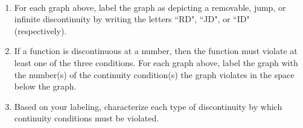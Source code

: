 \documentclass[11pt]{article}
\begin{document}
\begin{enumerate}
\begin{tikzpicture}[scale=1]
        \end{tikzpicture}
        \hfill
    \hfill\,\\


%
\begin{enumerate}
\item[i.] For each graph above, label the graph as depicting a removable, jump, or infinite discontinuity by writing the letters ``RD", ``JD", or ``ID" (respectively).\\
\item[ii.] If a function is discontinuous at a number, then the function must violate at least one of the three conditions. For each graph above, label the graph with the number(s) of the continuity condition(s) the graph violates in the space below the graph.\\
\item[iii.] Based on your labeling, characterize each type of discontinuity by which continuity conditions must be violated.
\end{enumerate}
    

\newpage



\end{enumerate}
\end{document}
